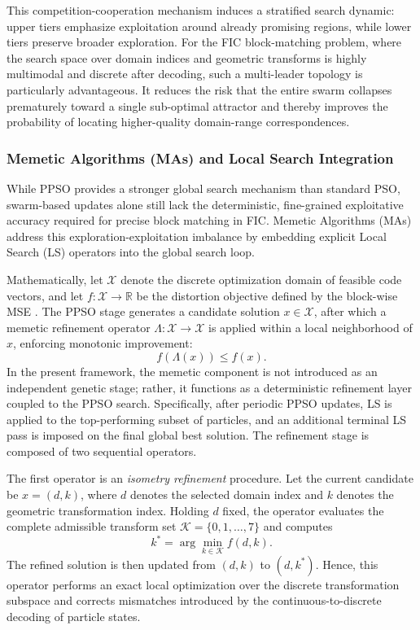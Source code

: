 \documentclass[conference]{IEEEtran}
\begin{document}
This competition-cooperation mechanism induces a stratified search dynamic: upper tiers emphasize exploitation around already promising regions, while lower tiers preserve broader exploration. For the FIC block-matching problem, where the search space over domain indices and geometric transforms is highly multimodal and discrete after decoding, such a multi-leader topology is particularly advantageous. It reduces the risk that the entire swarm collapses prematurely toward a single sub-optimal attractor and thereby improves the probability of locating higher-quality domain-range correspondences.

\subsubsection{Memetic Algorithms (MAs) and Local Search Integration}
While PPSO provides a stronger global search mechanism than standard PSO, swarm-based updates alone still lack the deterministic, fine-grained exploitative accuracy required for precise block matching in FIC. Memetic Algorithms (MAs) address this exploration-exploitation imbalance by embedding explicit Local Search (LS) operators into the global search loop. 

Mathematically, let $\mathcal{X}$ denote the discrete optimization domain of feasible code vectors, and let $f: \mathcal{X} \rightarrow \mathbb{R}$ be the distortion objective defined by the block-wise MSE \cite{FICOriginal}. The PPSO stage generates a candidate solution $x \in \mathcal{X}$, after which a memetic refinement operator $\Lambda: \mathcal{X} \rightarrow \mathcal{X}$ is applied within a local neighborhood of $x$, enforcing monotonic improvement:
\begin{equation}
f(\Lambda(x)) \le f(x).
\end{equation}
In the present framework, the memetic component is not introduced as an independent genetic stage; rather, it functions as a deterministic refinement layer coupled to the PPSO search. Specifically, after periodic PPSO updates, LS is applied to the top-performing subset of particles, and an additional terminal LS pass is imposed on the final global best solution. The refinement stage is composed of two sequential operators.

The first operator is an \emph{isometry refinement} procedure. Let the current candidate be $x=(d,k)$, where $d$ denotes the selected domain index and $k$ denotes the geometric transformation index. Holding $d$ fixed, the operator evaluates the complete admissible transform set $\mathcal{K}=\{0,1,\dots,7\}$ and computes
\begin{equation}
k^{*}=\arg\min_{k \in \mathcal{K}} f(d,k).
\end{equation}
The refined solution is then updated from $(d,k)$ to $(d,k^{*})$. Hence, this operator performs an exact local optimization over the discrete transformation subspace and corrects mismatches introduced by the continuous-to-discrete decoding of particle states.
\end{document}
